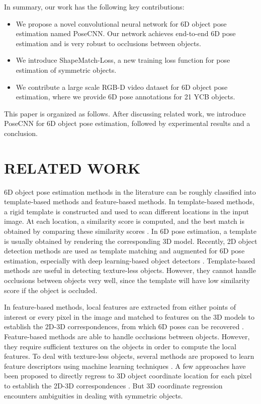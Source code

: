 \documentclass[conference]{IEEEtran}
\begin{document}
In summary, our work has the following key contributions:
\begin{itemize}
    \item We propose a novel convolutional neural network for 6D object pose estimation named PoseCNN. Our network achieves end-to-end 6D pose estimation and is very robust to occlusions between objects.
    \item We introduce ShapeMatch-Loss, a new training loss function for pose estimation of symmetric objects.
    \item We contribute a large scale RGB-D video dataset for 6D object pose estimation, where we provide 6D pose annotations for 21 YCB objects.
\end{itemize}

\noindent This paper is organized as follows. After discussing related work, we introduce PoseCNN for 6D object pose estimation, followed by experimental results and a conclusion.


\section{RELATED WORK}

6D object pose estimation methods in the literature can be roughly classified into template-based methods and feature-based methods. In template-based methods, a rigid template is constructed and used to scan different locations in the input image. At each location, a similarity score is computed, and the best match is obtained by comparing these similarity scores \cite{hinterstoisser2012gradient,hinterstoisser2012model,cao2016real}. In 6D pose estimation, a template is usually obtained by rendering the corresponding 3D model. Recently, 2D object detection methods are used as template matching and augmented for 6D pose estimation, especially with deep learning-based object detectors \cite{su2015render,rad2017bb8,kehl2017ssd,tekin2017real}. Template-based methods are useful in detecting texture-less objects. However, they cannot handle occlusions between objects very well, since the template will have low similarity score if the object is occluded.

In feature-based methods, local features are extracted from either points of interest or every pixel in the image and matched to features on the 3D models to establish the 2D-3D correspondences, from which 6D poses can be recovered \cite{lowe1999object,rothganger20063d,tulsiani2015viewpoints,pavlakos2017}. Feature-based methods are able to handle occlusions between objects. However, they require sufficient textures on the objects in order to compute the local features. To deal with texture-less objects, several methods are proposed to learn feature descriptors using machine learning techniques \cite{wohlhart2015learning,doumanoglou2016siamese}. A few approaches have been proposed to directly regress to 3D object coordinate location for each pixel to establish the 2D-3D correspondences \cite{brachmann2014learning,krull2015learning,brachmann2016uncertainty}. But 3D coordinate regression encounters ambiguities in dealing with symmetric objects.
\end{document}
